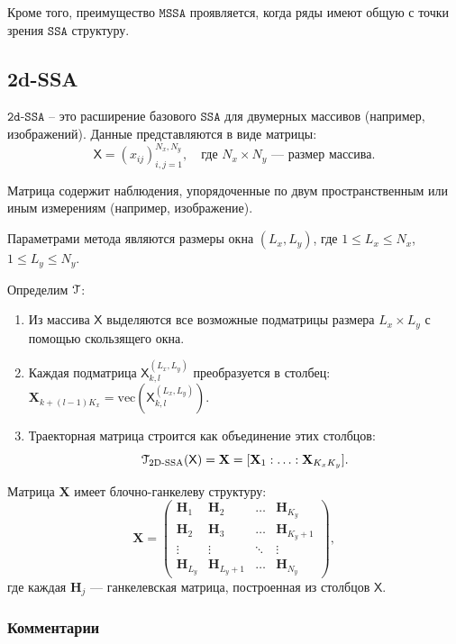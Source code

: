 \documentclass[12pt, specialist, subf
]{disser}
\theoremstyle{definition}
\newcommand{\SSA}{\texttt{SSA}}
\newcommand{\MSSA}{\texttt{MSSA}}
\newcommand{\DSSA}{\texttt{2d-SSA}}
\newcommand{\TS}{\mathsf{X}}
\newcommand{\EMB}{\EuScript{T}}
\begin{document}
Кроме того, преимущество $\MSSA$ проявляется, когда ряды имеют общую с точки зрения $\SSA$ структуру.



\subsection{2d-SSA}

$\DSSA$ -- это расширение базового $\SSA$ для двумерных массивов \cite[Глава~5, Раздел~5.1]{ssa_with_R} (например, изображений). Данные представляются в виде матрицы:
\[
	\TS = (x_{ij})_{i,j=1}^{N_x, N_y}, \quad \text{где } N_x \times N_y \text{ — размер массива.}
\]

Матрица содержит наблюдения, упорядоченные по двум пространственным или иным измерениям (например, изображение).

Параметрами метода являются размеры {окна} $(L_x, L_y)$, где $1 \leq L_x \leq N_x$, $1 \leq L_y \leq N_y$.

Определим $\EMB$:

\begin{enumerate}
	\item Из массива $\TS$ выделяются {все возможные подматрицы} размера $L_x \times L_y$ с помощью скользящего окна.
	\item Каждая подматрица $\TS_{k,l}^{(L_x, L_y)}$ преобразуется в столбец: $\mathbf{X}_{k+(l-1)K_x} = \text{vec}(\TS_{k,l}^{(L_x, L_y)})$.
	\item Траекторная матрица строится как объединение этих столбцов:
	      \[
		      \EuScript{T}_{\text{2D-SSA}}(\TS) = \mathbf{X} = [\mathbf{X}_1 : \ldots : \mathbf{X}_{K_x K_y}].
	      \]
\end{enumerate}

Матрица $\mathbf{X}$ имеет {блочно-ганкелеву структуру}:
\[
	\mathbf{X} =
	\begin{pmatrix}
		\mathbf{H}_1     & \mathbf{H}_2       & \ldots & \mathbf{H}_{K_y}   \\
		\mathbf{H}_2     & \mathbf{H}_3       & \ldots & \mathbf{H}_{K_y+1} \\
		\vdots           & \vdots             & \ddots & \vdots             \\
		\mathbf{H}_{L_y} & \mathbf{H}_{L_y+1} & \ldots & \mathbf{H}_{N_y}
	\end{pmatrix},
\]
где каждая $\mathbf{H}_j$ — ганкелевская матрица, построенная из столбцов $\TS$.

\subsubsection{Комментарии}
\end{document}
